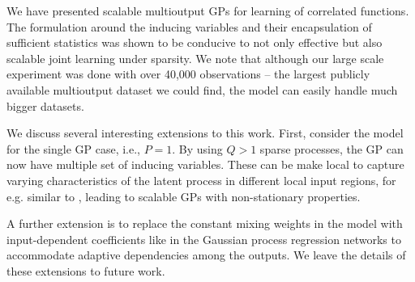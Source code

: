 We have presented scalable multioutput GPs for learning of correlated functions.
The formulation around the inducing variables and their encapsulation of sufficient statistics was shown to be conducive to not only effective but also scalable joint learning under sparsity. 
We note that although our large scale experiment was done with over 40,000 observations -- the largest publicly available multioutput dataset we could find, the model can easily handle much bigger datasets.

We discuss several interesting extensions to this work.
First, consider the model for the single GP case, i.e., $P = 1$. By using $Q > 1$ sparse processes, the GP can now have multiple set of inducing variables.
These can be make local to capture varying characteristics of the latent process in different local input regions, for e.g. similar to \citep{nguyen2014fast}, leading to scalable GPs with non-stationary properties. 

A further extension is to replace the constant mixing weights in the model with input-dependent coefficients like in the Gaussian process regression networks \citep[GPRN][]{wilson-et-al-icml-12} to accommodate adaptive dependencies among the outputs.
We leave the details of these extensions to future work.